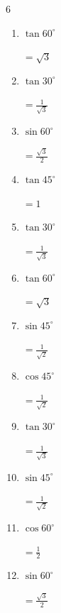 \begin{multicols}{6}
\begin{enumerate}
        $\displaystyle =\frac{1}{2}$

  \item $\displaystyle \tan{60^\circ}$

        $\displaystyle =\sqrt{3}$

  \item $\displaystyle \tan{30^\circ}$

        $\displaystyle =\frac{1}{\sqrt{3}}$

  \item $\displaystyle \sin{60^\circ}$

        $\displaystyle =\frac{\sqrt{3}}{2}$

  \item $\displaystyle \tan{45^\circ}$

        $\displaystyle =1$

  \item $\displaystyle \tan{30^\circ}$

        $\displaystyle =\frac{1}{\sqrt{3}}$

  \item $\displaystyle \tan{60^\circ}$

        $\displaystyle =\sqrt{3}$

\columnbreak %

\resetques

  \item $\displaystyle \sin{45^\circ}$

        $\displaystyle =\frac{1}{\sqrt{2}}$

  \item $\displaystyle \cos{45^\circ}$

        $\displaystyle =\frac{1}{\sqrt{2}}$

  \item $\displaystyle \tan{30^\circ}$

        $\displaystyle =\frac{1}{\sqrt{3}}$

  \item $\displaystyle \sin{45^\circ}$

        $\displaystyle =\frac{1}{\sqrt{2}}$

  \item $\displaystyle \cos{60^\circ}$

        $\displaystyle =\frac{1}{2}$

  \item $\displaystyle \sin{60^\circ}$

        $\displaystyle =\frac{\sqrt{3}}{2}$


\end{enumerate}
\end{multicols}
